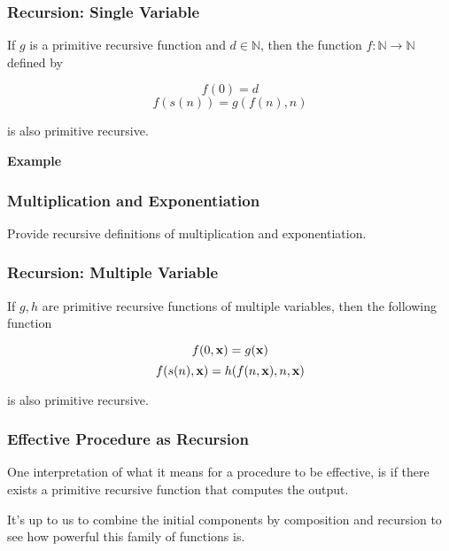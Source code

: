 \documentclass{beamer}
\theoremstyle{indentDefn} \newtheorem{defn}[]{Definition}
\begin{document}
\begin{frame}
	\frametitle{Recursion: Single Variable}

	If $g$ is a primitive recursive function and $d \in \mathbb{N}$, then the function $f:\mathbb{N} \rightarrow \mathbb{N}$ defined by 

	$$f(0) = d$$
	$$f(s(n)) = g(f(n),n)$$

	is also primitive recursive. 

	\vspace{0.5cm}

	{\bf Example}
	\vspace{4cm}

\end{frame}

\begin{frame}
	\frametitle{Multiplication and Exponentiation}

	Provide recursive definitions of multiplication and exponentiation.

	\vspace{7cm}
	
\end{frame}

\begin{frame}
	\frametitle{Recursion: Multiple Variable}

	If $g,h$ are primitive recursive functions of multiple variables, then the following function 

	$$f(0,{\bf x}) = g({\bf x})$$
	$$f(s(n),{\bf x}) = h(f(n,{\bf x}),n,{\bf x})$$

	is also primitive recursive. 


	\vspace{5cm}

\end{frame}

\begin{frame}
	\frametitle{Effective Procedure as Recursion}

	One interpretation of what it means for a procedure to be effective, is if there exists a primitive recursive function that computes the output.

	\vspace{0.5cm}

	It's up to us to combine the initial components by composition and recursion to see how powerful this family of functions is. 

	\vspace{5cm}

\end{frame}
\end{document}
